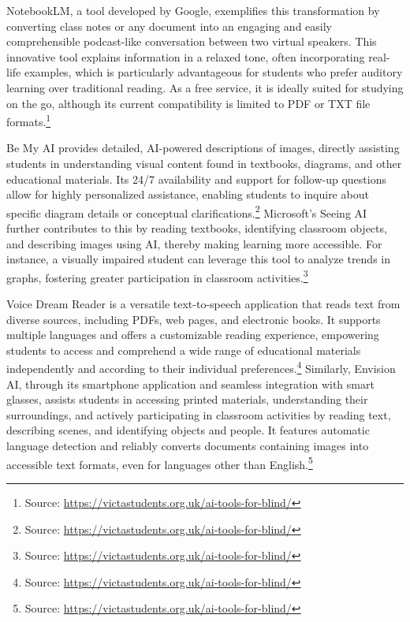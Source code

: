 NotebookLM, a tool developed by Google, exemplifies this transformation by converting class notes or any document into an engaging and easily comprehensible podcast-like conversation between two virtual speakers. This innovative tool explains information in a relaxed tone, often incorporating real-life examples, which is particularly advantageous for students who prefer auditory learning over traditional reading. As a free service, it is ideally suited for studying on the go, although its current compatibility is limited to PDF or TXT file formats.\footnote{Source: \url{https://victastudents.org.uk/ai-tools-for-blind/}}

Be My AI provides detailed, AI-powered descriptions of images, directly assisting students in understanding visual content found in textbooks, diagrams, and other educational materials. Its 24/7 availability and support for follow-up questions allow for highly personalized assistance, enabling students to inquire about specific diagram details or conceptual clarifications.\footnote{Source: \url{https://victastudents.org.uk/ai-tools-for-blind/}} Microsoft's Seeing AI further contributes to this by reading textbooks, identifying classroom objects, and describing images using AI, thereby making learning more accessible. For instance, a visually impaired student can leverage this tool to analyze trends in graphs, fostering greater participation in classroom activities.\footnote{Source: \url{https://victastudents.org.uk/ai-tools-for-blind/}}

Voice Dream Reader is a versatile text-to-speech application that reads text from diverse sources, including PDFs, web pages, and electronic books. It supports multiple languages and offers a customizable reading experience, empowering students to access and comprehend a wide range of educational materials independently and according to their individual preferences.\footnote{Source: \url{https://victastudents.org.uk/ai-tools-for-blind/}} Similarly, Envision AI, through its smartphone application and seamless integration with smart glasses, assists students in accessing printed materials, understanding their surroundings, and actively participating in classroom activities by reading text, describing scenes, and identifying objects and people. It features automatic language detection and reliably converts documents containing images into accessible text formats, even for languages other than English.\footnote{Source: \url{https://victastudents.org.uk/ai-tools-for-blind/}}

